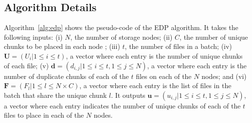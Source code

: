 
\subsection{Algorithm Details}

Algorithm~\ref{alg:edp} shows the pseudo-code of the EDP algorithm.  It takes
the following inputs: 
(i) $N$, the number of storage nodes;
(ii) $C$, the number of unique chunks to be placed in each node ;
(iii) $t$, the number of files in a batch; 
(iv) $\mathbf{U} = (U_i|1\le i \le t)$, a vector where each entry is the
number of unique chunks of each file;
(v) $\mathbf{d} = (d_{i,j} | 1 \le i \le t, 1 \le j \le N)$, a vector where
each entry is the number of duplicate chunks of each of the $t$ files on each
of the $N$ nodes; and 
(vi) $\mathbf{F} = (F_l | 1 \le l \le N\times C)$, a vector where each entry
is the list of files in the batch that share the unique chunk $l$. 
It outputs $\mathbf{u} = (u_{i,j}|1\le i \le t, 1\le j \le N)$, a vector where
each entry indicates the number of unique chunks of each of the $t$ files to
place in each of the $N$ nodes.

